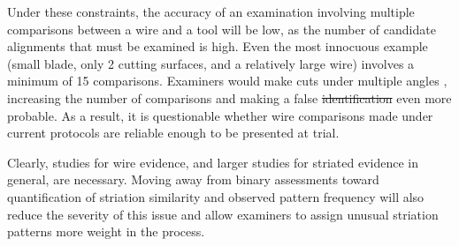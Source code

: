 \documentclass[9pt,twocolumn,twoside]{pnas-new}\usepackage[]{graphicx}\usepackage[dvipsnames]{xcolor}
\providecommand{\DIFadd}[1]{{\protect\color{blue}\uwave{#1}}} %
\providecommand{\DIFdel}[1]{{\protect\color{red}\sout{#1}}}                      %
\providecommand{\DIFaddbegin}{} %
\providecommand{\DIFaddend}{} %
\providecommand{\DIFdelbegin}{} %
\providecommand{\DIFdelend}{} %
\newcommand{\DIFscaledelfig}{0.5}
\newlength{\DIFdelgraphicswidth} %
\newlength{\DIFdelgraphicsheight} %
\newcommand{\DIFaddincludegraphics}[2][]{{\color{blue}\fbox{\DIFOincludegraphics[#1]{#2}}}} %
\newcommand{\DIFdelincludegraphics}[2][]{%
\sbox{\DIFdelgraphicsbox}{\DIFOincludegraphics[#1]{#2}}%
\settoboxwidth{\DIFdelgraphicswidth}{\DIFdelgraphicsbox} %
\settoboxtotalheight{\DIFdelgraphicsheight}{\DIFdelgraphicsbox} %
\scalebox{\DIFscaledelfig}{%
\parbox[b]{\DIFdelgraphicswidth}{\usebox{\DIFdelgraphicsbox}\\[-\baselineskip] \rule{\DIFdelgraphicswidth}{0em}}\llap{\resizebox{\DIFdelgraphicswidth}{\DIFdelgraphicsheight}{%
\setlength{\unitlength}{\DIFdelgraphicswidth}%
\begin{picture}(1,1)%
\thicklines\linethickness{2pt} %
{\color[rgb]{1,0,0}\put(0,0){\framebox(1,1){}}}%
{\color[rgb]{1,0,0}\put(0,0){\line( 1,1){1}}}%
{\color[rgb]{1,0,0}\put(0,1){\line(1,-1){1}}}%
\end{picture}%
}\hspace*{3pt}}} %
} %
\DeclareRobustCommand{\DIFaddbegin}{\DIFOaddbegin \let\includegraphics\DIFaddincludegraphics} %
\DeclareRobustCommand{\DIFaddend}{\DIFOaddend \let\includegraphics\DIFOincludegraphics} %
\DeclareRobustCommand{\DIFdelbegin}{\DIFOdelbegin \let\includegraphics\DIFdelincludegraphics} %
\DeclareRobustCommand{\DIFdelend}{\DIFOaddend \let\includegraphics\DIFOincludegraphics} %
\begin{document}
Under these constraints, the accuracy of an examination involving multiple comparisons between a wire and a tool will be low, as the number of candidate alignments that must be examined is high.
Even the most innocuous example (small blade, only 2 cutting surfaces, and a relatively large wire) involves a minimum of 15  %
comparisons.
Examiners would make cuts under multiple angles \citep{baikerToolmarkVariabilityQuality2015}, increasing the number of comparisons and making a false \DIFdelbegin \DIFdel{identification }\DIFdelend \DIFaddbegin \DIFadd{discovery }\DIFaddend even more probable.
As a result, it is questionable whether wire comparisons made under current protocols are reliable enough to be presented at trial.

Clearly, studies for wire evidence, and larger studies for striated evidence in general, are necessary.
Moving away from binary assessments toward quantification of striation similarity and observed pattern frequency will also reduce the severity of this issue and allow examiners to assign unusual striation patterns more weight in the process.
\end{document}
